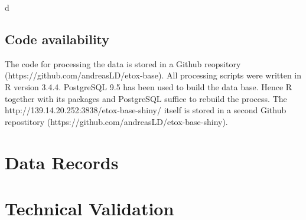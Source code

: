 d\documentclass[english]{article}
\newcommand{\app}{http://139.14.20.252:3838/etox-base-shiny/}
\newcommand{\git}{https://github.com/andreasLD/etox-base}
\newcommand{\gitapp}{https://github.com/andreasLD/etox-base-shiny}
\begin{document}
\subsection*{Code availability}

The code for processing the data is stored in a Github reopsitory (\git{}). All processing scripts were written in R version 3.4.4. PostgreSQL 9.5 has been used to build the data base. Hence R together with its packages and PostgreSQL suffice to rebuild the process. The \app{} itself is stored in a second Github repostitory (\gitapp{}).

\section*{Data Records}



\section*{Technical Validation}
\end{document}
